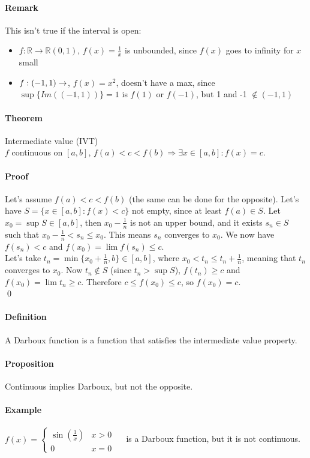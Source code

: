 \documentclass{article}
\newcommand{\func}[3]{#1 : #2 \rightarrow #3}
\newcommand{\funcR}[1]{#1 : \mathbb{R} \rightarrow \mathbb{R}}
\newcommand{\intcc}[1]{\left[#1\right]}
\newcommand{\intoo}[1]{\left(#1\right)}
\newcommand{\Def}{\paragraph{Definition}}
\newcommand{\Proposition}{\paragraph{Proposition}}
\newcommand{\Theorem}{\paragraph{Theorem}}
\newcommand{\Remark}{\paragraph{Remark}}
\newcommand{\Proof}{\paragraph{Proof}}
\newcommand{\Example}{\paragraph{Example}}
\begin{document}
  \Remark This isn't true if the interval is open:
  \begin{itemize}
    \item $\funcR{f}{\intoo{0,1}}$, $f(x) = \frac{1}{x}$ is unbounded, since
    $f(x)$ goes to infinity for $x$ small

    \item $\func{f}{\intoo{-1,1}}$, $f(x) = x^2$, doesn't have a max, since
    $\sup\{ Im(\intoo{-1,1}) \} = 1$ is $f(1)$ or $f(-1)$, but 1 and -1 $\notin
    \intoo{-1,1}$
  \end{itemize}

  \Theorem Intermediate value (IVT)
\\$f$ continuous on $\intcc{a,b}$, $f(a) < c < f(b) \Rightarrow \exists x \in
  \intcc{a,b} : f(x) = c$.

  \Proof Let's assume $f(a) < c < f(b)$ (the same can be done for the opposite).
  Let's have $S = \{ x \in \intcc{a,b} : f(x) < c \}$ not empty, since at least
  $f(a) \in S$. Let $x_0 = \sup S \in \intcc{a,b}$, then $x_0 - \frac{1}{n}$ is
  not an upper bound, and it exists $s_n \in S$ such that $x_0 - \frac{1}{n} <
  s_n \leq x_0$. This means $s_n$ converges to $x_0$. We now have $f(s_n) < c$
  and $f(x_0) = \lim f(s_n) \leq c$.
\\Let's take $t_n = \min \{ x_0 + \frac{1}{n}, b \} \in \intcc{a,b}$, where
  $x_0 < t_n \leq t_n + \frac{1}{n}$, meaning that $t_n$ converges to $x_0$. Now
  $t_n \notin S$ (since $t_n > \sup S$), $f(t_n) \geq c$ and $f(x_0) = \lim t_n
  \geq c$. Therefore $c \leq f(x_0) \leq c$, so $f(x_0) = c$.
\\\qed

  \Def A Darboux function is a function that satisfies the intermediate value
  property.

  \Proposition Continuous implies Darboux, but not the opposite.


  \Example $f(x) = \begin{cases}\sin(\frac{1}{x}) & x > 0 \\ 0 & x = 0\end{cases}
  \quad$ is a Darboux function, but it is not continuous.
\end{document}
